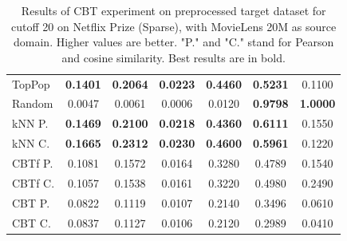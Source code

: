 \begin{table}[hbt]
\begin{tabulary}{\textwidth}{|L|CCCCCC|}
\hline
TopPop & \textbf{0.1401} & \textbf{0.2064} & \textbf{0.0223} & \textbf{0.4460} & \textbf{0.5231} & 0.1100 \\
Random & 0.0047 & 0.0061 & 0.0006 & 0.0120 & \textbf{0.9798} & \textbf{1.0000} \\
kNN P. & \textbf{0.1469} & \textbf{0.2100} & \textbf{0.0218} & \textbf{0.4360} & \textbf{0.6111} & 0.1550 \\
kNN C. & \textbf{0.1665} & \textbf{0.2312} & \textbf{0.0230} & \textbf{0.4600} & \textbf{0.5961} & 0.1220 \\
CBTf P. & 0.1081 & 0.1572 & 0.0164 & 0.3280 & 0.4789 & 0.1540 \\
CBTf C. & 0.1057 & 0.1538 & 0.0161 & 0.3220 & 0.4980 & 0.2490 \\
CBT P. & 0.0822 & 0.1119 & 0.0107 & 0.2140 & 0.3496 & 0.0610 \\
CBT C. & 0.0837 & 0.1127 & 0.0106 & 0.2120 & 0.2989 & 0.0410 \\
\hline
\end{tabulary}
\caption{Results of CBT experiment on preprocessed target dataset for cutoff 20 on Netflix Prize (Sparse), with MovieLens 20M as source domain. Higher values are better. "P." and "C." stand for Pearson and cosine similarity. Best results are in bold.}
\end{table}

